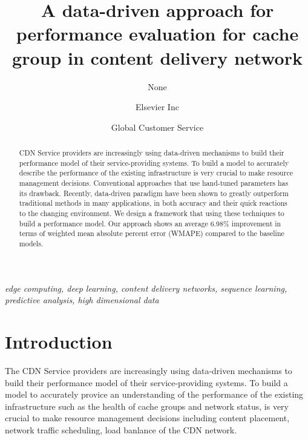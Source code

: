 \documentclass[review]{elsarticle}
\begin{document}
\begin{frontmatter}

\title{A data-driven approach for performance evaluation for cache group in content delivery network
    }

\author{None
    }
\address{Radarweg 29, Amsterdam}

\author[mymainaddress,mysecondaryaddress]{Elsevier Inc}

\author[mysecondaryaddress]{Global Customer Service}

\address[mymainaddress]{1600 John F Kennedy Boulevard, Philadelphia}
\address[mysecondaryaddress]{360 Park Avenue South, New York}

\begin{abstract}
CDN Service providers are increasingly using data-driven mechanisms to build their performance model of their service-providing systems. To build a model to accurately describe the performance of the existing infrastructure is very crucial to make resource management decisions. Conventional approaches that use hand-tuned parameters has its drawback. Recently, data-driven paradigm have been shown to greatly outperform traditional methods in many applications, in both accuracy and their quick reactions to the changing environment. We design a framework that using these techniques to build a performance model. Our approach shows an average 6.98\% improvement in terms of weighted mean absolute percent error (WMAPE) compared to the baseline models.
\end{abstract}
\begin{keyword}
\textit{edge computing, deep learning, content delivery networks, sequence learning, predictive analysis, high dimensional data}
\end{keyword}
\end{frontmatter}
\linenumbers
\section{Introduction}
The CDN Service providers are increasingly using data-driven mechanisms to build their performance model of their service-providing systems. To build a model to accurately provice an understanding of the performance of the existing infrastructure such as the health of cache groups and network status, is very crucial to make resource management decisions including content placement, network traffic scheduling, load banlance of the CDN network.
\end{document}
